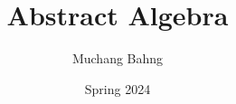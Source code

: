 \documentclass{article}
\begin{document}
\title{Abstract Algebra}
\author{Muchang Bahng}
\date{Spring 2024}

\maketitle
\tableofcontents
\pagebreak 
















 
\end{document}
